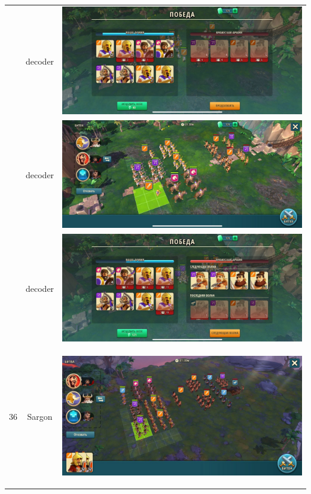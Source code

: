 \begin{longtable}{|c|c|c|}
	& decoder &
	\includegraphics[width=0.75\linewidth]{./parts/media/TreasureHunt/35/decoder/photo_2022-04-07_10-06-14.jpg} \\
	& decoder &
	\includegraphics[width=0.75\linewidth]{./parts/media/TreasureHunt/35/decoder/photo_2022-04-07_10-06-11.jpg} \\
	& decoder &
	\includegraphics[width=0.75\linewidth]{./parts/media/TreasureHunt/35/decoder/photo_2022-04-07_10-06-08.jpg} \\
	\hline
	\multirow{12}{*}{36} & Sargon &
	\hypertarget{fight36}{\includegraphics[width=0.75\linewidth]{./parts/media/TreasureHunt/36/sargon/photo_2022-04-07_13-16-23.jpg}} \\

\end{longtable}

